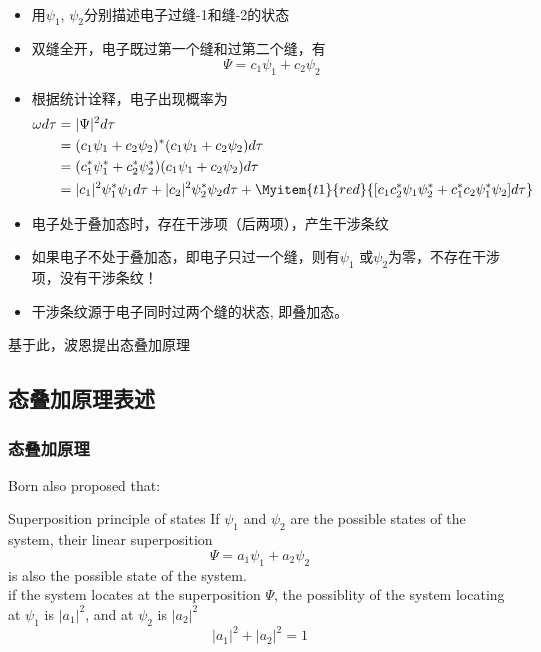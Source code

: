  
 \begin{frame} [allowframebreaks=]
     \分\\
     \begin{itemize}
          \item 用$\psi_1$, $\psi_2$分别描述电子过缝-1和缝-2的状态  \\
          \item 双缝全开，电子既过第一个缝和过第二个缝，有
             \[ \Psi=c_1 \psi_1+ c_2\psi_2 \]
          \item 根据统计诠释，电子出现概率为
         \begin{equation*}
         \begin{split}
             \omega d \tau&=|\Psi|^2 d \tau\\
             &= (c_1 \psi_1+ c_2\psi_2)^* (c_1 \psi_1+ c_2\psi_2) d \tau\\
             &=(c_1^*\psi_1^*+c_2^* \psi_2^*)(c_1 \psi_1+ c_2\psi_2)d \tau \\ 
             & = |c_1|^2\psi_1^*\psi_1 d \tau+ |c_2|^2\psi_2^*\psi_2  d \tau
             + \Myitem{t1}{red}{[c_1 c_2 ^* \psi_1 \psi_2 ^* + c_1 ^* c_2 \psi_1 ^* \psi_2]d \tau} \\
         \end{split} 
         \end{equation*}
     \end{itemize}
     \begin{itemize}
          \item 电子处于叠加态时，存在干涉项（后两项），产生干涉条纹
          \item 如果电子不处于叠加态，即电子只过一个缝，则有$\psi_1$ 或$\psi_2$为零，不存在干涉项，没有干涉条纹！
          \item 干涉条纹源于电子同时过两个缝的状态, 即叠加态。
     \end{itemize}
     基于此，波恩提出态叠加原理
 \end{frame}
 
 \subsection{态叠加原理表述}
 
 \begin{frame}
     \frametitle{态叠加原理}
     Born also proposed that: \\
     \begin{atcbox}{Superposition principle of states}
     If $\psi_1$ and $\psi_2$ are the possible states of the system,
     their linear superposition \[ \Psi=a_1 \psi_1+ a_2\psi_2 \]
     is also the possible state of the system.\\
     if the system locates at the superposition $\Psi$, the possiblity of the system locating at $\psi_1$ is $|a_1|^2$, and at $\psi_2$ is $|a_2|^2$ \\
     \[|a_1 |^2 + |a_2 |^2 =1\]
     \end{atcbox}
 \end{frame}
 
